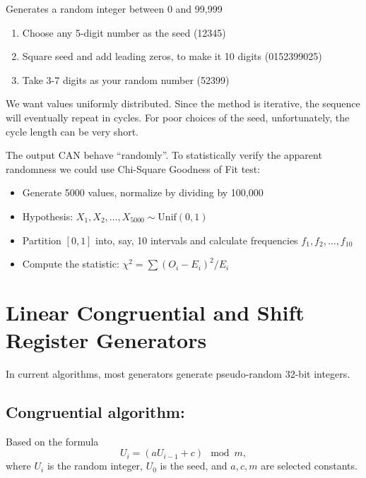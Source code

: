 \documentclass[captions=tableheading]{scrbook}
\begin{document}
Generates a random integer between 0 and 99,999


\begin{enumerate}
\item Choose any 5-digit number as the seed (12345)
\item Square seed and add leading zeros, to make it 10 digits (0152399025)
\item Take 3-7 digits as your random number (52399)
\end{enumerate}

We want values uniformly distributed. Since the method is iterative, the sequence will eventually repeat in cycles. For poor choices of the seed, unfortunately, the cycle length can be very short.

The output CAN behave ``randomly''. To statistically verify the apparent randomness we could use Chi-Square Goodness of Fit test:

\begin{itemize}
\item Generate 5000 values, normalize by dividing by 100,000
\item Hypothesis: $X_{1},X_{2},\ldots,X_{5000}\sim\mathrm{Unif}(0,1)$
\item Partition \( [0,1] \) into, say, 10 intervals and calculate frequencies $f_{1},f_{2},\ldots,f_{10}$
\item Compute the statistic: $\chi^{2}=\sum(O_{i}-E_{i})^{2}/E_{i}$
\end{itemize}
\section{Linear Congruential and Shift Register Generators}
\label{sec-2_2}


In current algorithms, most generators generate pseudo-random 32-bit integers.  
\subsection{Congruential algorithm:}
\label{sec-2_2_1}

Based on the formula 
\[
U_{i}=(aU_{i-1}+c)\mod m,
\]
where $U_{i}$ is the random integer, $U_{0}$ is the seed, and $a,c,m$ are selected constants.
\end{document}
